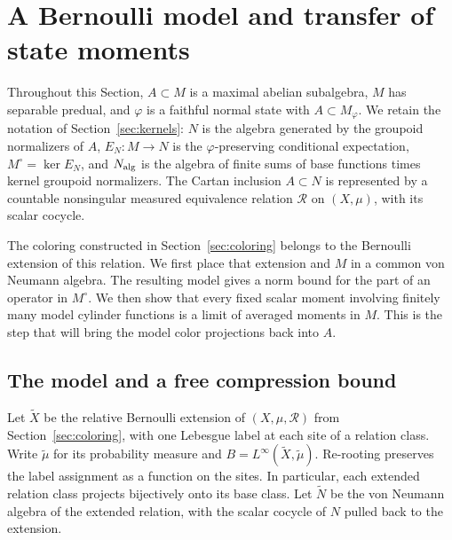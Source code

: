 \section{A Bernoulli model and transfer of state moments}
\label{sec:transfer}

Throughout this Section, $A\subset M$ is a maximal abelian subalgebra,
$M$ has separable predual, and $\varphi$ is a faithful normal state with
$A\subset M_\varphi$. We retain the notation of Section~\ref{sec:kernels}:
$N$ is the algebra generated by the groupoid normalizers of $A$,
$E_N:M\to N$ is the $\varphi$-preserving conditional expectation,
$M^\circ=\ker E_N$, and $N_{\rm alg}$ is the algebra of finite sums of
base functions times kernel groupoid normalizers. The Cartan inclusion
$A\subset N$ is represented by a countable nonsingular measured
equivalence relation $\mathcal R$ on $(X,\mu)$, with its scalar cocycle.

The coloring constructed in Section~\ref{sec:coloring} belongs to the
Bernoulli extension of this relation. We first place that extension and
$M$ in a common von Neumann algebra. The resulting model gives a norm
bound for the part of an operator in $M^\circ$. We then show that every
fixed scalar moment involving finitely many model cylinder functions is
a limit of averaged moments in $M$. This is the step that will bring the
model color projections back into $A$.

\subsection{The model and a free compression bound}

Let $\widetilde X$ be the relative Bernoulli extension of $(X,\mu,\mathcal R)$
from Section~\ref{sec:coloring}, with one Lebesgue label at each site of a
relation class. Write $\widetilde\mu$ for its probability measure and
$B=L^\infty(\widetilde X,\widetilde\mu)$. Re-rooting preserves the label
assignment as a function on the sites. In particular, each extended
relation class projects bijectively onto its base class. Let
$\widetilde N$ be the von Neumann algebra of the extended relation,
with the scalar cocycle of $N$ pulled back to the extension.

